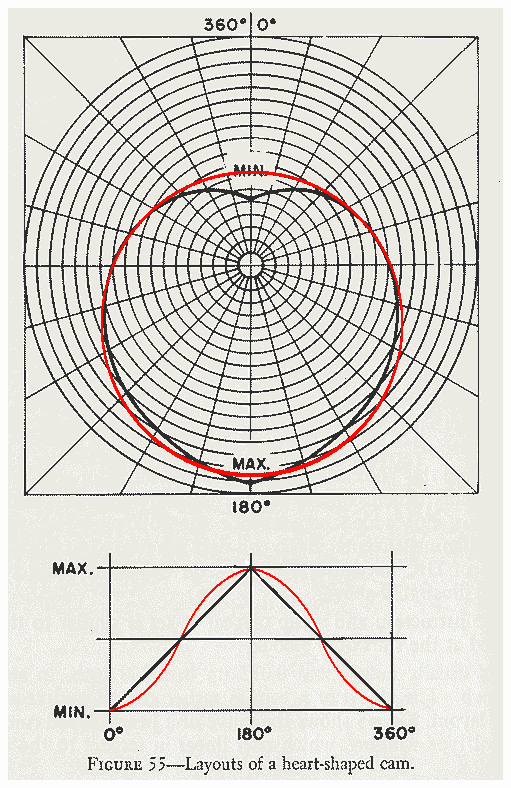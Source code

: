 \documentclass[11pt, english, a4paper, twopage]{article}
\begin{document}
\begin{enumerate}
\begin{minipage}[c][2cm][t]{0.2\textwidth}
 \includegraphics[width=\textwidth]{figures/nok_wikkelmachine}
\end{minipage}
\end{enumerate}
\end{document}
